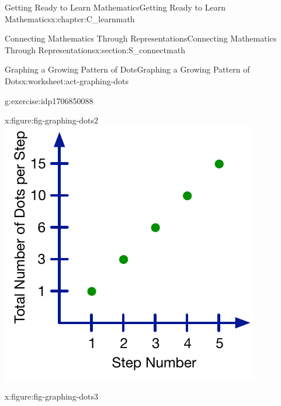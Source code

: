 \documentclass[oneside,10pt,]{book}
\numberwithin{equation}{chapter}
\begin{document}
\begin{chapterptx}{Getting Ready to Learn Mathematics}{}{Getting Ready to Learn Mathematics}{}{}{x:chapter:C_learnmath}
\begin{sectionptx}{Connecting Mathematics Through Representations}{}{Connecting Mathematics Through Representations}{}{}{x:section:S_connectmath}
\begin{worksheet-subsection}{Graphing a Growing Pattern of Dots}{}{Graphing a Growing Pattern of Dots}{}{}{x:worksheet:act-graphing-dots}
\begin{divisionexercise}{1}{}{}{g:exercise:idp1706850088}
\begin{sidebyside}{4}{0}{0}{0}
\begin{sbspanel}{0.25}
\begin{figureptx}{}{x:figure:fig-graphing-dots2}{}
\includegraphics[width=\linewidth]{external/graphing-dots2.pdf}
\tcblower
\end{figureptx}%
\end{sbspanel}%
\begin{sbspanel}{0.25}%
\begin{figureptx}{}{x:figure:fig-graphing-dots3}{}%

\end{figureptx}
\end{sbspanel}
\end{sidebyside}
\end{divisionexercise}
\end{worksheet-subsection}
\end{sectionptx}
\end{chapterptx}
\end{document}
